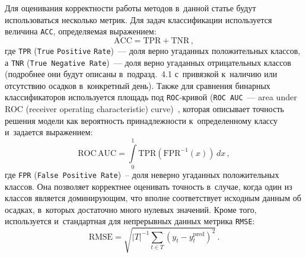 \begin{multicols}{2}
Для оценивания корректности работы методов в~данной статье будут 
использоваться несколько метрик. Для задач классификации используется 
величина \verb"ACC", определяемая выражением:
\begin{equation}
\label{ACC}
\mathrm{ACC= TPR + TNR}\,,
\end{equation}
где \verb"TPR" (\verb"True" \verb"Positive" \verb"Rate")~--- 
доля верно угаданных положительных классов, а \verb"TNR" (\verb"True Negative Rate")~--- 
доля верно угаданных отрицательных классов (подробнее они будут описаны 
в~подразд.~4.1 с~привязкой к~наличию или отсутствию осадков 
в~конкретный день). Также для сравнения бинарных классификаторов используется 
площадь под \verb"ROC"-кри\-вой (\verb"ROC AUC"~---
area under ROC (receiver operating characteristic) curve)~\cite{Huang2005}, которая 
описывает точность решения модели как вероятность принадлежности к~определенному 
классу и~задается выражением:
\begin{equation}
\label{AUC}
\mathrm{ROC\,AUC} = \int\limits_{0}^{1} \mathrm{TPR}\left(\mathrm{FPR}^{-1}(x)\right)\,dx\,,
\end{equation}
где \verb"FPR" (\verb"False Positive Rate")~-- доля неверно угаданных 
положительных классов. Она позволяет корректнее оценивать точность в~случае, 
когда один из классов является доминирующим, что вполне соответствует исходным 
данным об осадках, в~которых достаточно много нулевых значений. Кроме того, 
используется и~стандартная для непрерывных данных метрика \verb"RMSE":
\begin{equation}
\label{RMSE}
\mathrm{RMSE} = \sqrt{|T|^{-1}\sum\limits_{t\in T} \left(y_t - y^{\mathrm{pred}}_t\right)^2}\,.
\end{equation}

\begin{table*}[b]\small %
\begin{center}
\vspace*{2ex}



\end{center}
\end{table*}
\end{multicols}
